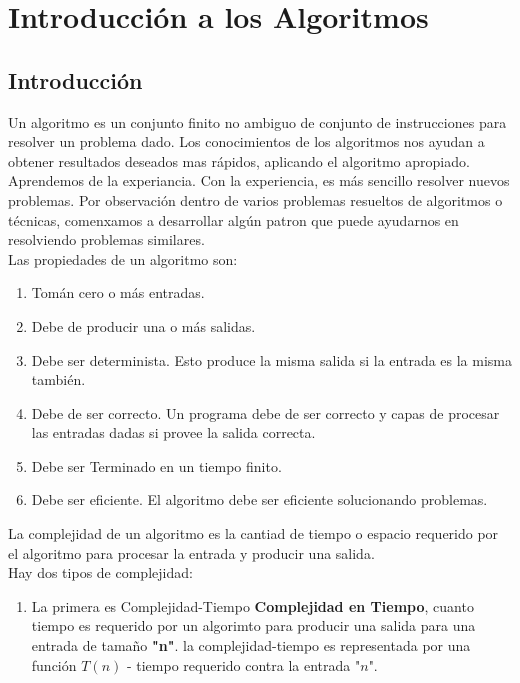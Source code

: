 \documentclass{subfiles}[../Book.tex]
\begin{document}
	\chapter{Introducción a los Algoritmos}
	\section{Introducción}
	Un algoritmo es un conjunto finito no ambiguo de conjunto de instrucciones para resolver un problema dado. Los conocimientos de los algoritmos nos ayudan a obtener resultados deseados mas rápidos, aplicando el algoritmo apropiado. Aprendemos de la experiancia. Con la experiencia, es más sencillo resolver nuevos problemas. Por observación dentro de varios problemas resueltos de algoritmos o técnicas, comenxamos a desarrollar algún patron que puede ayudarnos en resolviendo problemas similares.\\
	
	Las propiedades de un algoritmo son:
	\begin{enumerate}
		\item Tomán cero o más entradas.
		\item Debe de producir una o más salidas.
		\item Debe ser determinista. Esto produce la misma salida si la entrada es la misma también.
		\item Debe de ser correcto. Un programa debe de ser correcto y capas de procesar las entradas dadas si provee la salida correcta.
		\item Debe ser Terminado en un tiempo finito.
		\item  Debe ser eficiente. El algoritmo debe ser eficiente solucionando problemas.
	\end{enumerate}
	La complejidad de un algoritmo es la cantiad de tiempo o espacio requerido por el algoritmo para procesar la entrada y producir una salida.\\
	
	Hay dos tipos de complejidad:
	\begin{enumerate}
		\item  La primera es Complejidad-Tiempo \textbf{Complejidad en Tiempo}, cuanto tiempo es requerido por un algorimto para producir una salida para una entrada de tamaño \textbf{"n"}. la complejidad-tiempo es representada por una función $T(n)$ - tiempo requerido contra la entrada "$n$".
		
	\end{enumerate}
\end{document}
